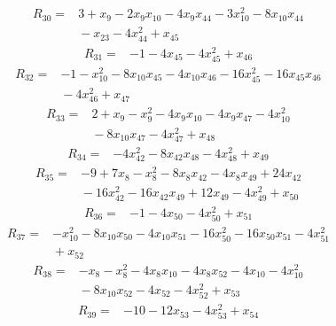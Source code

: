 {\begin{align*}
R_{30} ={}& 3 + x_{9} - 2x_{9} x_{10} - 4x_{9} x_{44} - 3x_{10}^{2} - 8x_{10} x_{44} \\
&{}  - x_{23} - 4x_{44}^{2} + x_{45}
\end{align*}
\begin{align*}
R_{31} ={}& -1 - 4x_{45} - 4x_{45}^{2} + x_{46}
\end{align*}
\begin{align*}
R_{32} ={}& -1 - x_{10}^{2} - 8x_{10} x_{45} - 4x_{10} x_{46} - 16x_{45}^{2} - 16x_{45} x_{46} \\
&{}  - 4x_{46}^{2} + x_{47}
\end{align*}
\begin{align*}
R_{33} ={}& 2 + x_{9} - x_{9}^{2} - 4x_{9} x_{10} - 4x_{9} x_{47} - 4x_{10}^{2} \\
&{}  - 8x_{10} x_{47} - 4x_{47}^{2} + x_{48}
\end{align*}
\begin{align*}
R_{34} ={}& -4x_{42}^{2} - 8x_{42} x_{48} - 4x_{48}^{2} + x_{49}
\end{align*}
\begin{align*}
R_{35} ={}& -9 + 7x_{8} - x_{8}^{2} - 8x_{8} x_{42} - 4x_{8} x_{49} + 24x_{42} \\
&{}  - 16x_{42}^{2} - 16x_{42} x_{49} + 12x_{49} - 4x_{49}^{2} + x_{50}
\end{align*}
\begin{align*}
R_{36} ={}& -1 - 4x_{50} - 4x_{50}^{2} + x_{51}
\end{align*}
\begin{align*}
R_{37} ={}& -x_{10}^{2} - 8x_{10} x_{50} - 4x_{10} x_{51} - 16x_{50}^{2} - 16x_{50} x_{51} - 4x_{51}^{2} \\
&{}  + x_{52}
\end{align*}
\begin{align*}
R_{38} ={}& -x_{8} - x_{8}^{2} - 4x_{8} x_{10} - 4x_{8} x_{52} - 4x_{10} - 4x_{10}^{2} \\
&{}  - 8x_{10} x_{52} - 4x_{52} - 4x_{52}^{2} + x_{53}
\end{align*}
\begin{align*}
R_{39} ={}& -10 - 12x_{53} - 4x_{53}^{2} + x_{54}
\end{align*}
}
